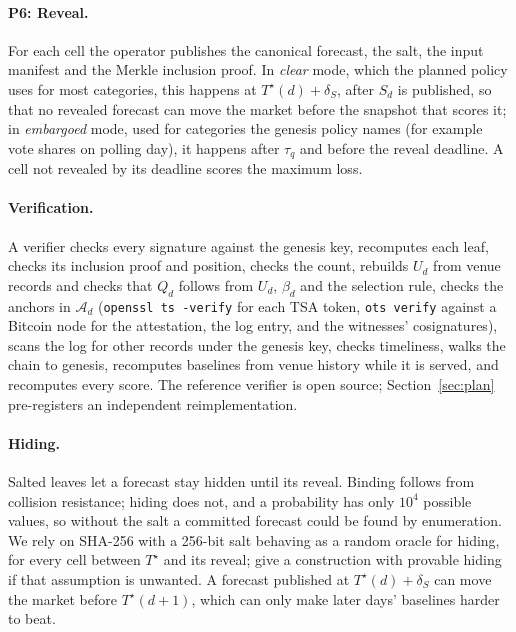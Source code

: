 \documentclass[11pt]{article}
\newcommand{\Ts}{T^{\star}}
\begin{document}
\paragraph{P6: Reveal.} For each cell the operator publishes the canonical forecast, the salt, the input manifest and the Merkle inclusion proof. In \emph{clear} mode, which the planned policy uses for most categories, this happens at $\Ts(d) + \delta_S$, after $S_d$ is published, so that no revealed forecast can move the market before the snapshot that scores it; in \emph{embargoed} mode, used for categories the genesis policy names (for example vote shares on polling day), it happens after $\tau_q$ and before the reveal deadline. A cell not revealed by its deadline scores the maximum loss.

\paragraph{Verification.} A verifier checks every signature against the genesis key, recomputes each leaf, checks its inclusion proof and position, checks the count, rebuilds $U_d$ from venue records and checks that $Q_d$ follows from $U_d$, $\beta_d$ and the selection rule, checks the anchors in $\mathcal{A}_d$ (\texttt{openssl ts -verify} for each TSA token, \texttt{ots verify} against a Bitcoin node for the attestation, the log entry, and the witnesses' cosignatures), scans the log for other records under the genesis key, checks timeliness, walks the chain to genesis, recomputes baselines from venue history while it is served, and recomputes every score. The reference verifier is open source; Section~\ref{sec:plan} pre-registers an independent reimplementation.

\paragraph{Hiding.} Salted leaves let a forecast stay hidden until its reveal. Binding follows from collision resistance; hiding does not, and a probability has only $10^4$ possible values, so without the salt a committed forecast could be found by enumeration. We rely on SHA-256 with a 256-bit salt behaving as a random oracle for hiding, for every cell between $\Ts$ and its reveal; \citet{halevi1996commit} give a construction with provable hiding if that assumption is unwanted. A forecast published at $\Ts(d) + \delta_S$ can move the market before $\Ts(d+1)$, which can only make later days' baselines harder to beat.
\end{document}
